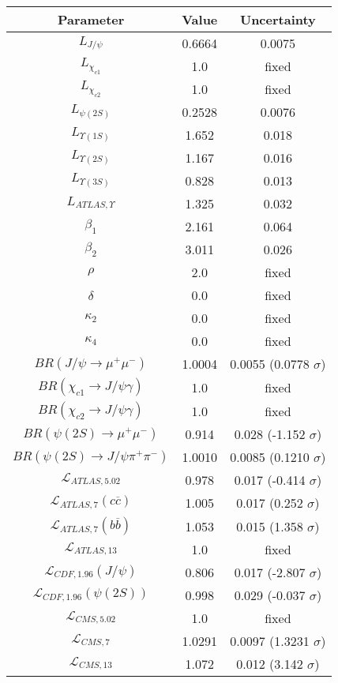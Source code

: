 \begin{table}[h!]
\centering
\begin{tabular}{c|c|c}
Parameter & Value & Uncertainty \\
\hline
$L_{J/\psi}$ & 0.6664 & 0.0075 \\
$L_{\chi_{c1}}$ & 1.0 & fixed \\
$L_{\chi_{c2}}$ & 1.0 & fixed \\
$L_{\psi(2S)}$ & 0.2528 & 0.0076 \\
$L_{\Upsilon(1S)}$ & 1.652 & 0.018 \\
$L_{\Upsilon(2S)}$ & 1.167 & 0.016 \\
$L_{\Upsilon(3S)}$ & 0.828 & 0.013 \\
$L_{ATLAS,\Upsilon}$ & 1.325 & 0.032 \\
$\beta_1$ & 2.161 & 0.064 \\
$\beta_2$ & 3.011 & 0.026 \\
$\rho$ & 2.0 & fixed \\
$\delta$ & 0.0 & fixed \\
$\kappa_2$ & 0.0 & fixed \\
$\kappa_4$ & 0.0 & fixed \\
$BR(J/\psi\rightarrow\mu^+\mu^-)$ & 1.0004 & 0.0055 (0.0778 $\sigma$) \\
$BR(\chi_{c1}\rightarrow J/\psi\gamma)$ & 1.0 & fixed \\
$BR(\chi_{c2}\rightarrow J/\psi\gamma)$ & 1.0 & fixed \\
$BR(\psi(2S)\rightarrow\mu^+\mu^-)$ & 0.914 & 0.028 (-1.152 $\sigma$) \\
$BR(\psi(2S)\rightarrow J/\psi\pi^+\pi^-)$ & 1.0010 & 0.0085 (0.1210 $\sigma$) \\
$\mathcal L_{ATLAS,5.02}$ & 0.978 & 0.017 (-0.414 $\sigma$) \\
$\mathcal L_{ATLAS,7}(c\overline c)$ & 1.005 & 0.017 (0.252 $\sigma$) \\
$\mathcal L_{ATLAS,7}(b\overline b)$ & 1.053 & 0.015 (1.358 $\sigma$) \\
$\mathcal L_{ATLAS,13}$ & 1.0 & fixed \\
$\mathcal L_{CDF,1.96}(J/\psi)$ & 0.806 & 0.017 (-2.807 $\sigma$) \\
$\mathcal L_{CDF,1.96}(\psi(2S))$ & 0.998 & 0.029 (-0.037 $\sigma$) \\
$\mathcal L_{CMS,5.02}$ & 1.0 & fixed \\
$\mathcal L_{CMS,7}$ & 1.0291 & 0.0097 (1.3231 $\sigma$) \\
$\mathcal L_{CMS,13}$ & 1.072 & 0.012 (3.142 $\sigma$) \\

\end{tabular}
\end{table}
